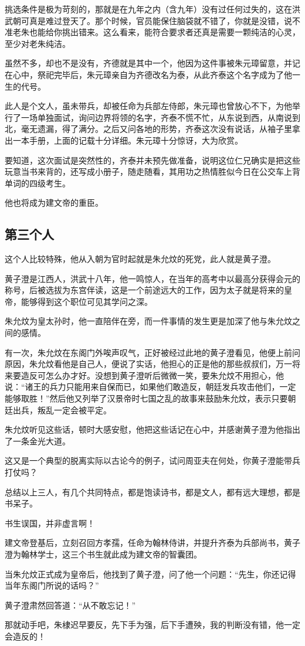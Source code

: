 \begin{multicols}{\theparacolNo}
		挑选条件是极为苛刻的，那就是在九年之内（含九年）没有过任何过失的，这在洪武朝可真是难过登天了。那个时候，官员能保住脑袋就不错了，你就是没错，说不准老朱也能给你挑出错来。这么看来，能符合要求者还真是需要一颗纯洁的心灵，至少对老朱纯洁。

		虽然不多，却也不是没有，齐德就是其中一个，他因为这件事被朱元璋留意，并记在心中，祭祀完毕后，朱元璋亲自为齐德改名为泰，从此齐泰这个名字成为了他一生的代号。

		此人是个文人，虽未带兵，却被任命为兵部左侍郎，朱元璋也曾放心不下，为他举行了一场单独面试，询问边界将领的名字，齐泰不慌不忙，从东说到西，从南说到北，毫无遗漏，得了满分。之后又问各地的形势，齐泰这次没有说话，从袖子里拿出一本手册，上面的记载十分详细。朱元璋十分惊讶，大为欣赏。

		要知道，这次面试是突然性的，齐泰并未预先做准备，说明这位仁兄确实是把这些玩意当书来背的，还写成小册子，随走随看，其用功之热情胜似今日在公交车上背单词的四级考生。

		他也将成为建文帝的重臣。

		\subsection{第三个人}
		这个人比较特殊，他从入朝为官时起就是朱允炆的死党，此人就是黄子澄。

		黄子澄是江西人，洪武十八年，他一鸣惊人，在当年的高考中以最高分获得会元的称号，后被选拔为东宫伴读，这是一个前途远大的工作，因为太子就是将来的皇帝，能够得到这个职位可见其学问之深。

		朱允炆为皇太孙时，他一直陪伴在旁，而一件事情的发生更是加深了他与朱允炆之间的感情。

		有一次，朱允炆在东阁门外唉声叹气，正好被经过此地的黄子澄看见，他便上前问原因，朱允炆看他是自己人，便说了实话，他担心的正是他的那些叔叔们，万一将来要造反可怎么办才好。没想到黄子澄听后微微一笑，要朱允炆不用担心，他说：“诸王的兵力只能用来自保而已，如果他们敢造反，朝廷发兵攻击他们，一定能够取胜！”然后他又列举了汉景帝时七国之乱的故事来鼓励朱允炆，表示只要朝廷出兵，叛乱一定会被平定。

		朱允炆听见这些话，顿时大感安慰，他把这些话记在心中，并感谢黄子澄为他指出了一条金光大道。

		这又是一个典型的脱离实际以古论今的例子，试问周亚夫在何处，你黄子澄能带兵打仗吗？

		总结以上三人，有几个共同特点，都是饱读诗书，都是文人，都有远大理想，都是书呆子。

		书生误国，并非虚言啊！

		建文帝登基后，立刻召回方孝孺，任命为翰林侍讲，并提升齐泰为兵部尚书，黄子澄为翰林学士，这三个书生就此成为建文帝的智囊团。

		当朱允炆正式成为皇帝后，他找到了黄子澄，问了他一个问题：“先生，你还记得当年东阁门所说的话吗？”

		黄子澄肃然回答道：“从不敢忘记！”

		那就动手吧，朱棣迟早要反，先下手为强，后下手遭殃，我的判断没有错，他一定会造反的！
		\ifnum{}
	\end{multicols}
\fi
\newpage
